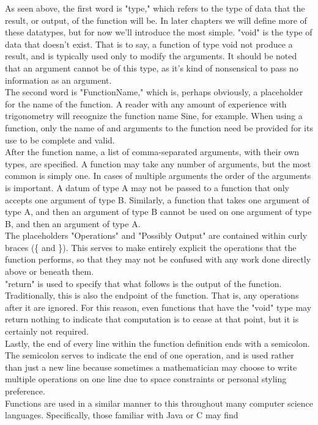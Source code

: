 As seen above, the first word is "type," which refers to the type of data that the result, or output, of the function will be. In later chapters we will define more of these datatypes, but for now we'll introduce the most simple.
"void" is the type of data that doesn't exist. That is to say, a function of type void not produce a result, and is typically used only to modify the arguments.
It should be noted that an argument cannot be of this type, as it's kind of nonsensical to pass no information as an argument. \\
The second word is "FunctionName," which is, perhaps obviously, a placeholder for the name of the function. A reader with any amount of experience with trigonometry will recognize the function name Sine, for example. When using a function, only the name of and arguments to the function need be provided for its use to be complete and valid. \\
After the function name, a list of comma-separated arguments, with their own types, are specified. A function may take any number of arguments, but the most common is simply one. In cases of multiple arguments the order of the arguments is important. A datum of type A may not be passed to a function that only accepts one argument of type B. Similarly, a function that takes one argument of type A, and then an argument of type B cannot be used on one argument of type B, and then an argument of type A. \\
The placeholders "Operations" and "Possibly Output" are contained within curly braces (\{ and \}). This serves to make entirely explicit the operations that the function performs, so that they may not be confused with any work done directly above or beneath them. \\
"return" is used to specify that what follows is the output of the function. Traditionally, this is also the endpoint of the function. That is, any operations after it are ignored. For this reason, even functions that have the "void" type may return nothing to indicate that computation is to cease at that point, but it is certainly not required. \\
Lastly, the end of every line within the function definition ends with a semicolon. The semicolon serves to indicate the end of one operation, and is used rather than just a new line because sometimes a mathematician may choose to write multiple operations on one line due to space constraints or personal styling preference. \\
Functions are used in a similar manner to this throughout many computer science languages. Specifically, those familiar with Java or C may find 
